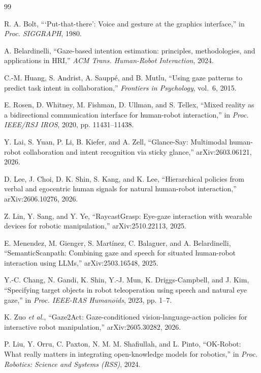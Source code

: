 \documentclass[letterpaper, 10 pt, conference]{ieeeconf}  %
\begin{document}
\begin{thebibliography}{99}

 R. A. Bolt, ```Put-that-there': Voice and gesture
at the graphics interface,'' in \emph{Proc. SIGGRAPH}, 1980.

 A. Belardinelli, ``Gaze-based intention
estimation: principles, methodologies, and applications in HRI,''
\emph{ACM Trans. Human-Robot Interaction}, 2024.

 C.-M. Huang, S. Andrist, A. Saupp\'e, and
B. Mutlu, ``Using gaze patterns to predict task intent in
collaboration,'' \emph{Frontiers in Psychology}, vol.~6, 2015.

 E. Rosen, D. Whitney, M. Fishman, D. Ullman, and
S. Tellex, ``Mixed reality as a bidirectional communication interface
for human-robot interaction,'' in \emph{Proc. IEEE/RSJ IROS}, 2020,
pp. 11431--11438.

 Y. Lai, S. Yuan, P. Li, B. Kiefer, and A. Zell,
``Glance-Say: Multimodal human-robot collaboration and intent
recognition via sticky glance,'' arXiv:2603.06121, 2026.

 D. Lee, J. Choi, D. K. Shin, S. Kang, and K. Lee,
``Hierarchical policies from verbal and egocentric human signals for
natural human-robot interaction,'' arXiv:2606.10276, 2026.

 Z. Lin, Y. Sang, and Y. Ye,
``RaycastGrasp: Eye-gaze interaction with wearable devices for
robotic manipulation,'' arXiv:2510.22113, 2025.

 E. Menendez, M. Gienger, S. Mart\'inez,
C. Balaguer, and A. Belardinelli, ``SemanticScanpath: Combining gaze
and speech for situated human-robot interaction using LLMs,''
arXiv:2503.16548, 2025.

 Y.-C. Chang, N. Gandi, K. Shin, Y.-J. Mun,
K. Driggs-Campbell, and J. Kim, ``Specifying target objects in robot
teleoperation using speech and natural eye gaze,'' in \emph{Proc.
IEEE-RAS Humanoids}, 2023, pp. 1--7.

 K. Zuo \emph{et al.}, ``Gaze2Act:
Gaze-conditioned vision-language-action policies for interactive
robot manipulation,'' arXiv:2605.30282, 2026.

 P. Liu, Y. Orru, C. Paxton, N. M. M. Shafiullah,
and L. Pinto, ``OK-Robot: What really matters in integrating
open-knowledge models for robotics,'' in \emph{Proc. Robotics:
Science and Systems (RSS)}, 2024.


\end{thebibliography}
\end{document}
